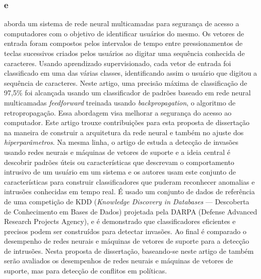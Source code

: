 \subsubsection{ e }
 aborda um sistema de rede neural multicamadas para segurança de acesso a computadores com o objetivo de identificar usuários do mesmo. Os vetores de entrada foram compostos pelos intervalos de tempo entre pressionamentos de teclas sucessivos criados pelos usuários ao digitar uma sequência conhecida de caracteres. Usando aprendizado supervisionado, cada vetor de entrada foi classificado em uma das várias classes, identificando assim o usuário que digitou a sequência de caracteres. Neste artigo, uma precisão máxima de classificação de 97,5\% foi alcançada usando um classificador de padrões baseado em rede neural multicamadas \textit{feedforward} treinada usando \textit{backpropagation}, o algoritmo de retropropagação. Essa abordagem visa melhorar a segurança do acesso ao computador. Este artigo trouxe contribuições para esta proposta de dissertação na maneira de construir a arquitetura da rede neural e também no ajuste dos \textit{hiperparâmetros}. Na mesma linha, o artigo de  estuda a detecção de invasões usando redes neurais e máquinas de vetores de suporte e a ideia central é descobrir padrões úteis ou características que descrevam o comportamento intrusivo de um usuário em um sistema e os autores usam este conjunto de características para construir classificadores que puderam reconhecer anomalias e intrusões conhecidas em tempo real. É usado um conjunto de dados de referência de uma competição de KDD (\textit{Knowledge Discovery in Databases} --- Descoberta de Conhecimento em Bases de Dados) projetada pela DARPA (Defense Advanced Research Projects Agency), e é demonstrado que classificadores eficientes e precisos podem ser construídos para detectar invasões. Ao final é comparado o desempenho de redes neurais e máquinas de vetores de suporte para a detecção de intrusões. Nesta proposta de dissertação, baseando-se neste artigo de  também serão avaliados os desempenhos de redes neurais e máquinas de vetores de suporte, mas para detecção de conflitos em políticas.

